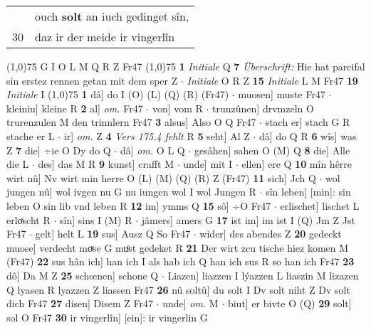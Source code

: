 \documentclass[8pt,a4paper,notitlepage]{article}
\begin{document}
\begin{table}[ht]
\begin{minipage}[t]{0.5\linewidth}
\begin{tabular}{rl}
 & ouch \textbf{solt} an iuch gedinget sîn,\\ 
30 & daz ir der meide ir vingerlîn\\ 
\end{tabular}
\scriptsize
\line(1,0){75} \newline
G I O L M Q R Z Fr47 \newline
\line(1,0){75} \newline
\textbf{1} \textit{Initiale} Q  \textbf{7} \textit{Überschrift:} Hie hat parcifal sin erstez rennen getan mit dem sper Z   $\cdot$ \textit{Initiale} O R Z  \textbf{15} \textit{Initiale} L M Fr47  \textbf{19} \textit{Initiale} I  \newline
\line(1,0){75} \newline
\textbf{1} dâ] do I (O) (L) (Q) (R) (Fr47)  $\cdot$ muosen] muste Fr47  $\cdot$ kleiniu] kleine R \textbf{2} al] \textit{om.} Fr47  $\cdot$ von] vom R  $\cdot$ trunzûnen] drvmzeln O trurenzulen M den trinnlern Fr47 \textbf{3} alsus] Also O Q Fr47  $\cdot$ stach er] stach G R stache er L  $\cdot$ ir] \textit{om.} Z \textbf{4} \textit{Vers 175.4 fehlt} R  \textbf{5} seht] Al Z  $\cdot$ dâ] do Q R \textbf{6} wîs] was Z \textbf{7} die] ÷ie O Dy do Q  $\cdot$ dâ] \textit{om.} O L Q  $\cdot$ gesâhen] sahen O (M) Q \textbf{8} die] Alle die L  $\cdot$ des] das M R \textbf{9} kunst] crafft M  $\cdot$ unde] mit I  $\cdot$ ellen] ere Q \textbf{10} mîn hêrre wirt nû] Nv wirt min herre O (L) (M) (Q) (R) Z (Fr47) \textbf{11} sich] Jch Q  $\cdot$ wol jungen nû] wol ivgen nu G nu iungen wol I wol Jungen R  $\cdot$ sîn leben] [min]: sin leben O sin lib vnd leben R \textbf{12} im] ymms Q \textbf{15} sô] ÷O Fr47  $\cdot$ erlischet] lischet L erloͯscht R  $\cdot$ sîn] sins I (M) R  $\cdot$ jâmers] amers G \textbf{17} ist im] im ist I (Q) Jm Z Jst Fr47  $\cdot$ gelt] helt L \textbf{19} sus] Ausz Q So Fr47  $\cdot$ wider] des abendes Z \textbf{20} gedeckt muose] verdecht moͮse G muͦst gedeket R \textbf{21} Der wirt zcu tische hiez komen M (Fr47) \textbf{22} sus hân ich] han ich I als hab ich Q han ich sus R so han ich Fr47 \textbf{23} dô] Da M Z \textbf{25} schœnen] schone Q  $\cdot$ Liazen] liazzen I lýazzen L liaszin M lizazen Q lyasen R lyazzen Z liassen Fr47 \textbf{26} nû soltû] du solt I Dv solt niht Z Dv solt dich Fr47 \textbf{27} disen] Disem Z Fr47  $\cdot$ unde] \textit{om.} M  $\cdot$ biut] er bivte O (Q) \textbf{29} solt] sol O Fr47 \textbf{30} ir vingerlîn] [ein]: ir vingerlin G \newline
\end{minipage}
\hspace{0.5cm}

\end{table}
\end{document}
